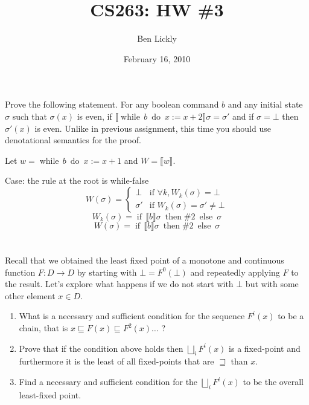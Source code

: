 \documentclass{article}
\title{CS263: HW \#3}
\author{Ben Lickly}
\date{February 16, 2010}
\newcommand{\problem}[1]
{\subsubsection*{} %
\vspace{-16pt} \section{} \vspace{-22pt} \qquad
#1%
\bigskip \bigskip
}
\newcommand{\while}[2]{\operatorname{while}\, #1\ \operatorname{do}\ #2}
\newcommand{\ifthen}[3]{\operatorname{if}\, #1
\ \operatorname{then}\#2\ \operatorname{else}\ #3}
\newcommand{\denote}[1]{\llbracket #1 \rrbracket}
\begin{document}
\maketitle
\problem{
Prove the following statement. For any boolean command $b$ and any initial state
$\sigma$ such that $\sigma(x)$ is even, if $\denote{\while{b}{x := x + 2}}
\sigma = \sigma'$ and if $\sigma = \bot$ then $\sigma'(x)$ is even. Unlike in previous assignment, this time you should use denotational semantics
for the proof.
}

Let $w = \while{b}{x := x +1}$ and $W = \denote{w}.$

Case: the rule at the root is while-false
\[
W(\sigma) = \begin{cases}
            \bot    &\text{if } \forall k, W_k(\sigma) = \bot \\
            \sigma' &\text{if } W_k(\sigma) = \sigma' \ne \bot
            \end{cases}
\]
\[
W_k(\sigma) = \ifthen{\denote{b}\sigma}{W_{k-1}(\denote{c}\sigma)}{\sigma}
\]
\[
W(\sigma) = \ifthen{\denote{b}\sigma}{W(\denote{c}\sigma)}{\sigma}
\]


\problem{
Recall that we obtained the least fixed point of a monotone
and continuous function $F : D \to D$ by starting with $\bot = F^0(\bot)$ and
repeatedly applying $F$ to the result. Let's explore what happens if we do not
start with $\bot$ but with some other element $x \in D$.
\begin{enumerate}
  \item What is a necessary and sufficient condition for the sequence $F^i(x)$
  to be a chain, that is $x \sqsubseteq F(x) \sqsubseteq F^2 (x) \ldots$ ?

  \item Prove that if the condition above holds then $\bigsqcup_i F^i (x)$ is a
  fixed-point and furthermore it is the least of all fixed-points that are
  $\sqsupseteq$ than $x$.

  \item Find a necessary and sufficient condition for the $\bigsqcup_i F^i (x)$ to be
the overall least-fixed point.
\end{enumerate}
}
\end{document}
